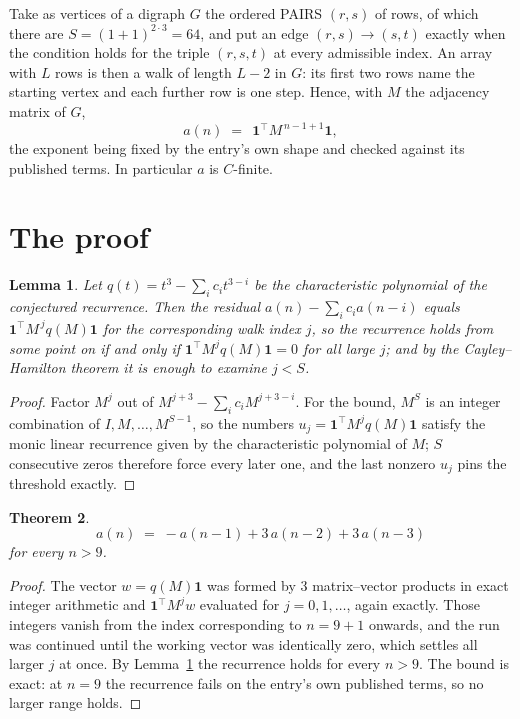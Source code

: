 \documentclass[11pt,a4paper]{article}
\theoremstyle{plain}
\newtheorem{theorem}{Theorem}
\newtheorem{lemma}[theorem]{Lemma}
\theoremstyle{definition}
\begin{document}
Take as vertices of a digraph $G$ the ordered PAIRS $(r,s)$ of rows, of which there are
$S=(1+1)^{2\cdot3}=64$, and put an edge $(r,s)\to(s,t)$ exactly when the condition
holds for the triple $(r,s,t)$ at every admissible index. An array with $L$ rows is then a
walk of length $L-2$ in $G$: its first two rows name the starting vertex and each further
row is one step. Hence, with $M$ the adjacency matrix of $G$,
\[
a(n)\;=\;\,\mathbf{1}^{\!\top}M^{\,n-1+1}\mathbf{1},
\]
the exponent being fixed by the entry's own shape and checked against its published terms.
In particular $a$ is $C$-finite.

\section{The proof}

\begin{lemma}\label{lem:crit}
Let $q(t)=t^{3}-\sum_i c_it^{3-i}$ be the characteristic polynomial of the
conjectured recurrence. Then the residual $a(n)-\sum_ic_ia(n-i)$ equals
$\mathbf{1}^{\!\top}M^{\,j}q(M)\mathbf{1}$ for the corresponding walk index
$j$, so the recurrence holds from some point on if and only if
$\mathbf{1}^{\!\top}M^{j}q(M)\mathbf{1}=0$ for all large $j$; and by the
Cayley--Hamilton theorem it is enough to examine $j<S$.
\end{lemma}

\begin{proof}
Factor $M^{j}$ out of $M^{j+3}-\sum_ic_iM^{j+3-i}$. For the bound, $M^{S}$
is an integer combination of $I,M,\dots,M^{S-1}$, so the numbers
$u_j=\mathbf{1}^{\!\top}M^{j}q(M)\mathbf{1}$ satisfy the monic linear recurrence given by
the characteristic polynomial of $M$; $S$ consecutive zeros therefore force every later one,
and the last nonzero $u_j$ pins the threshold exactly.
\end{proof}

\begin{theorem}
\[
a(n)\;=\;-a(n-1) + 3\,a(n-2) + 3\,a(n-3)
\]
for every $n>9$.
\end{theorem}

\begin{proof}
The vector $w=q(M)\mathbf{1}$ was formed by $3$ matrix--vector products in exact
integer arithmetic and $\mathbf{1}^{\!\top}M^{j}w$ evaluated for $j=0,1,\dots$, again
exactly. Those integers vanish from the index corresponding to $n=9+1$ onwards, and the
run was continued until the working vector was identically zero, which settles all larger $j$
at once. By Lemma~\ref{lem:crit} the recurrence holds for every $n>9$. The bound is exact: at $n=9$ the recurrence fails on the entry's own published terms, so no larger range holds.
\end{proof}
\end{document}
